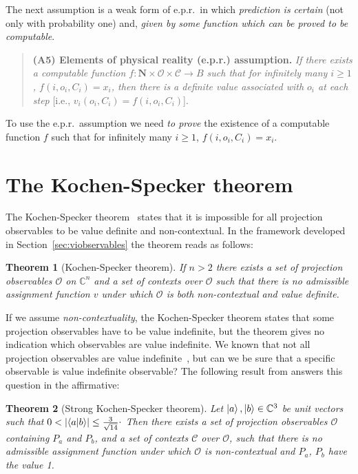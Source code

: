 \documentclass[%
 preprint,
 showpacs,
 showkeys,
 preprintnumbers,
  amsmath,amssymb,
  aps,
 pra,
  longbibliography,
  floatfix,
 ]{revtex4-1}
\theoremstyle{plain}
\newtheorem{theorem}{Theorem}[section]
\newcommand{\iprod}[2]{\langle #1 | #2 \rangle}
\begin{document}
 The next assumption is a  weak form of e.p.r.\ in which {\em prediction is certain} (not only with probability one) and, {\em given by some function which  can be  proved to be computable}.

\begin{quote}    {\bf (A5) Elements of physical reality (e.p.r.) assumption.} {\em If
there exists a computable function $f : \mathbf{N}\times \mathcal{O}\times \mathcal{C} \to B$
such that for infinitely many $i\ge 1$, $f(i,o_i,C_i)=x_i$, then there is a definite value associated with $o_i$ at each step}
[i.e., $v_i(o_i,C_i)=f(i,o_i,C_i)$].
\end{quote}

To  use the e.p.r.\ assumption we need {\em to prove} the existence of a computable function $f$ such  that for infinitely many $i\ge 1$, $f(i,o_i,C_i)=x_i$.



\section{The Kochen-Specker theorem}
\label{sec:kstheorem}

 The Kochen-Specker theorem~\cite{kochen1} states that it is impossible for all projection observables to be value definite and non-contextual.  In the framework developed in Section~\ref{sec:viobservables} the theorem reads as follows:

 \begin{theorem}[Kochen-Specker theorem]
\label{thm:kstheorem}
 If $n>2$ there exists a set of projection observables $\mathcal{O}$ on $\mathbb{C}^n$ and a set of contexts over $\mathcal{O}$ such that there is no admissible assignment function $v$ under which $\mathcal{O}$ is both non-contextual and value definite.
\end{theorem}

 If we assume
{\em non-contextuality}, the Kochen-Specker theorem states that some projection observables  have to be value indefinite, but  the  theorem gives no indication which  observables are value indefinite. We known that not all projection observables are value indefinite~\cite{ACCS}, but can we be sure that a specific observable is value indefinite observable? The following result from \cite{ACCS} answers this question in the affirmative:



\begin{theorem}[Strong Kochen-Specker theorem]

\label{thm:twonotvaluedefinite}
        Let $\ket{a}, \ket{b}\in \mathbb{C}^3$ be unit vectors such that $0 < |\iprod{a}{b}| \le \frac{3}{\sqrt{14}}\raisebox{.8mm}{.}$
        Then there exists a set of projection observables $\mathcal{O}$ containing $P_a$ and $P_b$, and a set of contexts $\mathcal{C}$ over $\mathcal{O}$, such that there is no admissible assignment function under which $\mathcal{O}$ is non-contextual and $P_a$, $P_b$ have the value 1.
\end{theorem}
\end{document}
